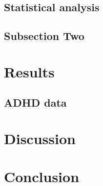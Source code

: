\documentclass[preprint,12pt]{elsarticle}
\begin{document}
\subsection{Statistical analysis}

\subsection{Subsection Two}

\section{Results}
\subsection{ADHD data}

\section{Discussion}

\section{Conclusion}
\label{S:2}




\end{document}
